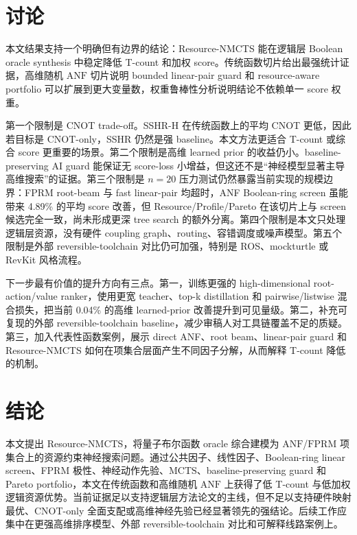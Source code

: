 \documentclass[UTF8,fontset=macnew,11pt]{ctexart}
\newcommand{\method}{Resource-NMCTS}
\newcommand{\anf}{\ensuremath{\mathrm{ANF}}}
\newcommand{\fprm}{\ensuremath{\mathrm{FPRM}}}
\newcommand{\mcts}{\ensuremath{\mathrm{MCTS}}}
\begin{document}
\section{讨论}

本文结果支持一个明确但有边界的结论：\method{} 能在逻辑层 Boolean oracle synthesis 中稳定降低 T-count 和加权 score。传统函数切片给出最强统计证据，高维随机 \anf{} 切片说明 bounded linear-pair guard 和 resource-aware portfolio 可以扩展到更大变量数，权重鲁棒性分析说明结论不依赖单一 score 权重。

第一个限制是 CNOT trade-off。SSHR-H 在传统函数上的平均 CNOT 更低，因此若目标是 CNOT-only，SSHR 仍然是强 baseline。本文方法更适合 T-count 或综合 score 更重要的场景。第二个限制是高维 learned prior 的收益仍小。baseline-preserving AI guard 能保证无 score-loss 小增益，但这还不是“神经模型显著主导高维搜索”的证据。第三个限制是 $n=20$ 压力测试仍然暴露当前实现的规模边界：FPRM root-beam 与 fast linear-pair 均超时，ANF Boolean-ring screen 虽能带来 4.89\% 的平均 score 改善，但 Resource/Profile/Pareto 在该切片上与 screen 候选完全一致，尚未形成更深 tree search 的额外分离。第四个限制是本文只处理逻辑层资源，没有硬件 coupling graph、routing、容错调度或噪声模型。第五个限制是外部 reversible-toolchain 对比仍可加强，特别是 ROS、mockturtle 或 RevKit 风格流程。

下一步最有价值的提升方向有三点。第一，训练更强的 high-dimensional root-action/value ranker，使用更宽 teacher、top-k distillation 和 pairwise/listwise 混合损失，把当前 0.04\% 的高维 learned-prior 改善提升到可见量级。第二，补充可复现的外部 reversible-toolchain baseline，减少审稿人对工具链覆盖不足的质疑。第三，加入代表性函数案例，展示 direct ANF、root beam、linear-pair guard 和 \method{} 如何在项集合层面产生不同因子分解，从而解释 T-count 降低的机制。

\section{结论}

本文提出 \method{}，将量子布尔函数 oracle 综合建模为 \anf{}/\fprm{} 项集合上的资源约束神经搜索问题。通过公共因子、线性因子、Boolean-ring linear screen、FPRM 极性、神经动作先验、\mcts{}、baseline-preserving guard 和 Pareto portfolio，本文在传统函数和高维随机 \anf{} 上获得了低 T-count 与低加权逻辑资源优势。当前证据足以支持逻辑层方法论文的主线，但不足以支持硬件映射最优、CNOT-only 全面支配或高维神经先验已经显著领先的强结论。后续工作应集中在更强高维排序模型、外部 reversible-toolchain 对比和可解释线路案例上。
\end{document}
